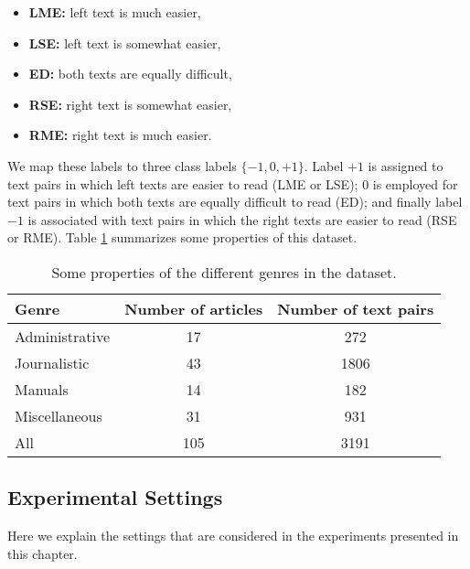 \begin{itemize}
  \item \textbf{LME:} left text is much easier,
  \item \textbf{LSE:} left text is somewhat easier, 
  \item \textbf{ED:} both texts are equally difficult,
  \item \textbf{RSE:} right text is somewhat easier,
  \item \textbf{RME:} right text is much easier.
\end{itemize}

We map these labels to three class labels $\lbrace -1, 0, +1 \rbrace$.  Label $+1$ is assigned to text pairs in which left texts are easier to read (LME or LSE); 
$0$ is employed for text pairs in which both texts are equally difficult to read (ED); and finally label $-1$ is associated with text pairs in which the right texts are easier to read (RSE or RME). 
Table \ref{tab:genre-prop} summarizes some properties of this dataset.

\begin{table}[!ht]
  \begin{center}
    \begin{tabular}{lcc}
      \toprule
      \textbf{Genre} & \textbf{Number of articles} & \textbf{Number of text pairs} \\
      \midrule
      Administrative  & 17                 & 272                  \\
      Journalistic    & 43                 & 1806                 \\
      Manuals         & 14                 & 182                  \\
      Miscellaneous   & 31                 & 931                  \\
      All             & 105                & 3191                 \\
      \bottomrule
    \end{tabular}
  \end{center}
  \caption{Some properties of the different genres in the \declercqds dataset.}
  \label{tab:genre-prop}
\end{table}

\subsection{Experimental Settings}
Here we explain the settings that are considered in the experiments presented in this chapter. 

